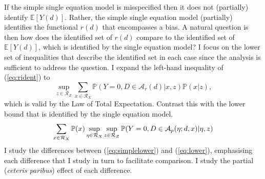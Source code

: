 \documentclass[12pt,a4paper,twoside]{article}
\numberwithin{equation}{section}
\begin{document}
If the simple single equation model is misspecified then it does not (partially) identify $\mathbb{E}[Y(d)]$. Rather, the simple single equation model (partially) identifies the functional $r(d)$ that encompasses a bias. A natural question is then how does the identified set of $r(d)$ compare to the identified set of $\mathbb{E}[Y(d)]$, which is identified by the single equation model? I focus on the lower set of inequalities that describe the identified set in each case since the analysis is sufficient to address the question. I expand the left-hand inequality of (\ref{eq:rident}) to
\begin{equation}
\sup_{z\in\mathcal{R}_Z}\sum_{x\in\mathcal{R}_X}\mathbb{P}(Y=0,D\in\mathcal{A}_r(d)|x,z)\mathbb{P}(x|z),\label{eq:simplelower}
\end{equation}
which is valid by the Law of Total Expectation. Contrast this with the lower bound that is identified by the single equation model. 
\begin{equation}
\sum_{x\in\mathcal{R}_X}\mathbb{P}(\color{black}x\color{black})\color{black}\sup_{\eta\in\mathcal{R}_X}\sup_{z\in\mathcal{R}_Z}\color{black}\mathbb{P}(Y=0,D\in\color{black}\mathcal{A}_p(\eta;d,x)\color{black}|\color{black}\eta\color{black},z)\label{eq:lower}
\end{equation} 
I study the differences between (\ref{eq:simplelower}) and (\ref{eq:lower}), emphasising each difference that I study in turn to facilitate comparison. I study the partial (\emph{ceteris paribus}) effect of each difference.
\end{document}

